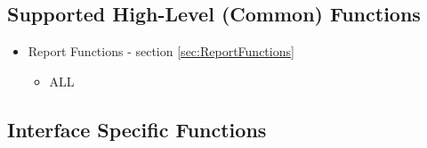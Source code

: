 
\subsection{Supported High-Level (Common) Functions}\label{sec:UserRMHighLevel}

\begin{itemize}[noitemsep,nolistsep] 
	\item{Report Functions - section \ref{sec:ReportFunctions}}
	\begin{itemize}[noitemsep,nolistsep] 
		\item{ALL}
	\end{itemize}
\end{itemize}


\subsection{Interface Specific Functions}\label{sec:UserRMFunctions}

